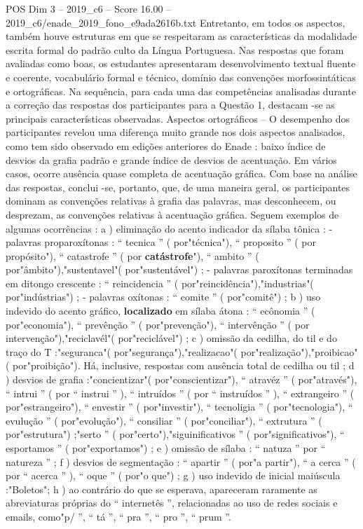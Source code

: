 \begin{textsample}{POS Dim 3 – 2019\_c6 – Score 16.00 – 2019\_c6/enade\_2019\_fono\_e9ada2616b.txt}
Entretanto, em todos os aspectos, também houve estruturas em que se respeitaram as características da modalidade escrita formal do padrão culto da Língua Portuguesa.
Nas respostas que foram avaliadas como boas, os estudantes apresentaram desenvolvimento textual fluente e coerente, vocabulário formal e técnico, domínio das convenções morfossintáticas e ortográficas.
Na sequência, para cada uma das competências analisadas durante a correção das respostas dos participantes para a Questão 1, destacam -se as principais características observadas.
Aspectos ortográficos – O desempenho dos participantes revelou uma diferença muito grande nos dois aspectos analisados, como tem sido observado em edições anteriores do Enade : baixo índice de desvios da grafia padrão e grande índice de desvios de acentuação.
Em vários casos, ocorre ausência quase completa de acentuação gráfica.
Com base na análise das respostas, conclui -se, portanto, que, de uma maneira geral, os participantes dominam as convenções relativas à grafia das palavras, mas desconhecem, ou desprezam, as convenções relativas à acentuação gráfica.
Seguem exemplos de algumas ocorrências : a ) eliminação do acento indicador da sílaba tônica : - palavras proparoxítonas : “ tecnica ” ( por"técnica"), “ proposito ” ( por propósito"), “ catastrofe ” ( por \textbf{catástrofe}"), “ ambito ” ( por"âmbito"),"sustentavel"( por"sustentável") ; - palavras paroxítonas terminadas em ditongo crescente : “ reincidencia ” ( por"reincidência"),"industrias"( por"indústrias") ; - palavras oxítonas : “ comite ” ( por"comitê") ; b ) uso indevido do acento gráfico, \textbf{localizado} em sílaba átona : “ ecônomia ” ( por"economia"), “ prevênção ” ( por"prevenção"), “ intervênção ” ( por intervenção"),"reciclavél"( por"reciclável") ; c ) omissão da cedilha, do til e do traço do T :"seguranca"( por"segurança"),"realizacao"( por"realização"),"proibicao"( por"proibição").
Há, inclusive, respostas com ausência total de cedilha ou til ; d ) desvios de grafia :"concientizar"( por"conscientizar"), “ atravéz ” ( por"através"), “ intrui ” ( por “ instrui ” ), “ intruídos ” ( por “ instruídos ” ), “ extrangeiro ” ( por"estrangeiro"), “ envestir ” ( por"investir"), “ tecnoligia ” ( por"tecnologia"), “ evulução ” ( por"evolução"), “ consiliar ” ( por"conciliar"), “ extrutura ” ( por"estrutura") ;"serto ” ( por"certo"),"siguinificativos ” ( por"significativos"), “ esportamos ” ( por"exportamos") ; e ) omissão de sílaba : “ natuza ” por “ natureza ” ; f ) desvios de segmentação : “ apartir ” ( por"a partir"), “ a cerca ” ( por “ acerca ” ), “ oque ” ( por"o que") ; g ) uso indevido de inicial maiúscula :"Boletos"; h ) ao contrário do que se esperava, apareceram raramente as abreviaturas próprias do “ internetês ”, relacionadas ao uso de redes sociais e emails, como"p/ ”, “ tá ”, “ pra ”, “ pro ”, “ prum ”.

\end{textsample}
